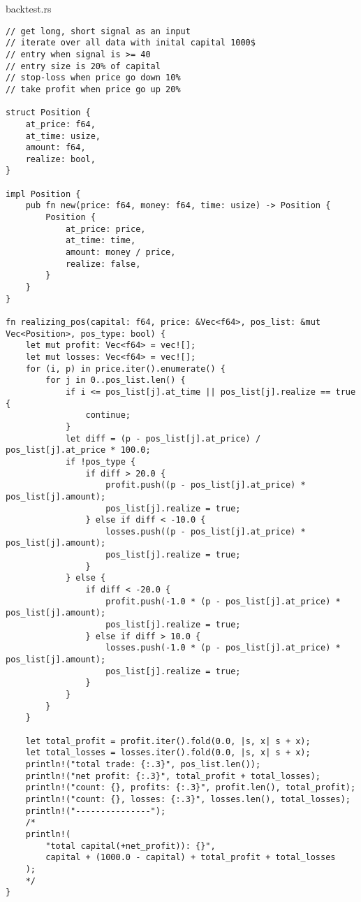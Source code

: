 \noindent backtest.rs
\begin{verbatim}  
// get long, short signal as an input
// iterate over all data with inital capital 1000$
// entry when signal is >= 40
// entry size is 20% of capital
// stop-loss when price go down 10%
// take profit when price go up 20%

struct Position {
    at_price: f64,
    at_time: usize,
    amount: f64,
    realize: bool,
}

impl Position {
    pub fn new(price: f64, money: f64, time: usize) -> Position {
        Position {
            at_price: price,
            at_time: time,
            amount: money / price,
            realize: false,
        }
    }
}

fn realizing_pos(capital: f64, price: &Vec<f64>, pos_list: &mut Vec<Position>, pos_type: bool) {
    let mut profit: Vec<f64> = vec![];
    let mut losses: Vec<f64> = vec![];
    for (i, p) in price.iter().enumerate() {
        for j in 0..pos_list.len() {
            if i <= pos_list[j].at_time || pos_list[j].realize == true {
                continue;
            }
            let diff = (p - pos_list[j].at_price) / pos_list[j].at_price * 100.0;
            if !pos_type {
                if diff > 20.0 {
                    profit.push((p - pos_list[j].at_price) * pos_list[j].amount);
                    pos_list[j].realize = true;
                } else if diff < -10.0 {
                    losses.push((p - pos_list[j].at_price) * pos_list[j].amount);
                    pos_list[j].realize = true;
                }
            } else {
                if diff < -20.0 {
                    profit.push(-1.0 * (p - pos_list[j].at_price) * pos_list[j].amount);
                    pos_list[j].realize = true;
                } else if diff > 10.0 {
                    losses.push(-1.0 * (p - pos_list[j].at_price) * pos_list[j].amount);
                    pos_list[j].realize = true;
                }
            }
        }
    }

    let total_profit = profit.iter().fold(0.0, |s, x| s + x);
    let total_losses = losses.iter().fold(0.0, |s, x| s + x);
    println!("total trade: {:.3}", pos_list.len());
    println!("net profit: {:.3}", total_profit + total_losses);
    println!("count: {}, profits: {:.3}", profit.len(), total_profit);
    println!("count: {}, losses: {:.3}", losses.len(), total_losses);
    println!("---------------");
    /*
    println!(
        "total capital(+net_profit)): {}",
        capital + (1000.0 - capital) + total_profit + total_losses
    );
    */
}


\end{verbatim}
